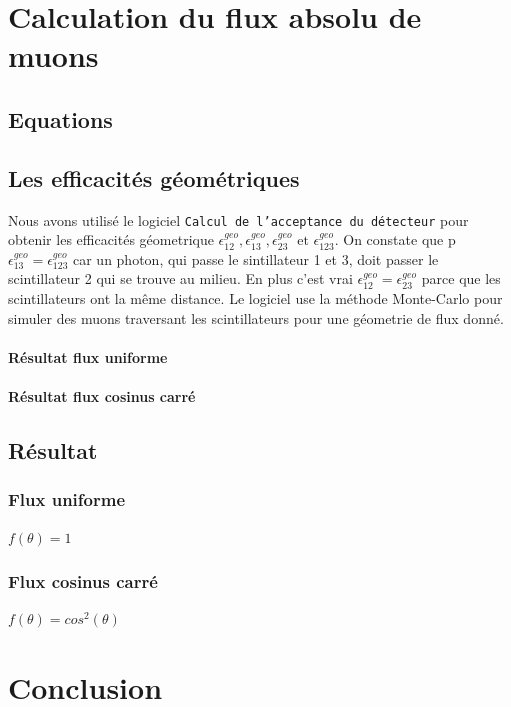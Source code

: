 \documentclass[a4paper,11pt,liststotocnumbered,bibtotocnumbered]{scrartcl}
\begin{document}
  

 \section{Calculation du flux absolu de muons}
  \subsection{Equations} 
  
  \subsection{Les efficacités géométriques}
   Nous avons utilisé le logiciel \texttt{Calcul de l'acceptance du détecteur} pour obtenir les efficacités géometrique $\epsilon_{12}^{geo},\epsilon_{13}^{geo}, \epsilon_{23}^{geo}\text{ et }\epsilon_{123}^{geo}$. On constate que p$\epsilon_{13}^{geo}=\epsilon_{123}^{geo}$ car un photon, qui passe le sintillateur 1 et 3, doit passer le scintillateur 2 qui se trouve au milieu. En plus c'est vrai $\epsilon_{12}^{geo}=\epsilon_{23}^{geo}$ parce que les scintillateurs ont la même distance. Le logiciel use la méthode Monte-Carlo pour simuler des muons traversant les scintillateurs pour une géometrie de flux donné.
   \paragraph{Résultat flux uniforme}

   \paragraph{Résultat flux cosinus carré}
 
  \subsection{Résultat}
   \subsubsection{Flux uniforme}
    $f(\theta)=1$

   \subsubsection{Flux cosinus carré}
    $f(\theta)=cos^2(\theta)$


 \section{Conclusion}
  
 
 
 \begin{appendix}
  
    

  \listoffigures  
 \end{appendix}
\end{document}
